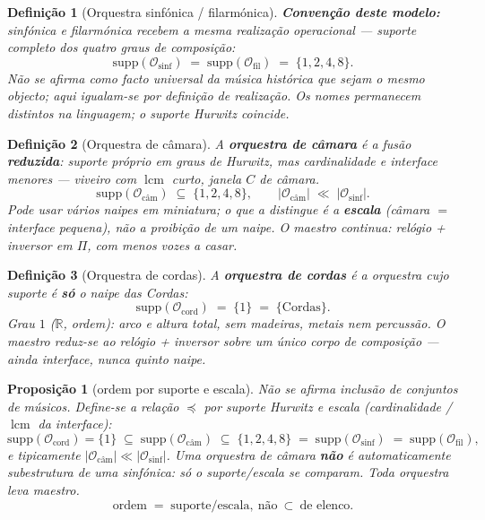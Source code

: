 \documentclass[11pt,a4paper]{article}
\newtheorem{definicao}{Definição}
\newtheorem{proposicao}{Proposição}
\begin{document}
\begin{definicao}[Orquestra sinfónica / filarmónica]\label{def:sinfonica}
\textbf{Convenção deste modelo:} sinfónica e filarmónica recebem a
\emph{mesma} realização operacional --- suporte completo dos quatro
graus de composição:
\[
\mathrm{supp}(\mathcal{O}_{\mathrm{sinf}})
\;=\;
\mathrm{supp}(\mathcal{O}_{\mathrm{fil}})
\;=\;
\{1,2,4,8\}.
\]
Não se afirma como facto universal da música histórica que sejam o
mesmo objecto; aqui igualam-se por definição de realização. Os nomes
permanecem distintos na linguagem; o suporte Hurwitz coincide.
\end{definicao}

\begin{definicao}[Orquestra de câmara]\label{def:camara}
A \textbf{orquestra de câmara} é a fusão \textbf{reduzida}: suporte
próprio em graus de Hurwitz, mas cardinalidade e interface menores
--- viveiro com $\operatorname{lcm}$ curto, janela $C$ de câmara.
\[
\mathrm{supp}(\mathcal{O}_{\mathrm{câm}})
\;\subseteq\;
\{1,2,4,8\},
\qquad
|\mathcal{O}_{\mathrm{câm}}|
\;\ll\;
|\mathcal{O}_{\mathrm{sinf}}|.
\]
Pode usar vários naipes em miniatura; o que a distingue é a
\textbf{escala} (câmara $=$ interface pequena), não a proibição de um
naipe. O maestro continua: relógio + inversor em $\Pi$, com menos
vozes a casar.
\end{definicao}

\begin{definicao}[Orquestra de cordas]\label{def:orq-cordas}
A \textbf{orquestra de cordas} é a orquestra cujo suporte é
\textbf{só} o naipe das Cordas:
\[
\mathrm{supp}(\mathcal{O}_{\mathrm{cord}})
\;=\;
\{1\}
\;=\;
\{\text{Cordas}\}.
\]
Grau $1$ ($\mathbb{R}$, ordem): arco e altura total, sem madeiras,
metais nem percussão. O maestro reduz-se ao relógio + inversor sobre
um único corpo de composição --- ainda interface, nunca quinto naipe.
\end{definicao}

\begin{proposicao}[ordem por suporte e escala]\label{prop:orq-hier}
Não se afirma inclusão de conjuntos de músicos. Define-se a relação
$\preceq$ por suporte Hurwitz e escala (cardinalidade / $\operatorname{lcm}$
da interface):
\[
\mathrm{supp}(\mathcal{O}_{\mathrm{cord}})=\{1\}
\;\subseteq\;
\mathrm{supp}(\mathcal{O}_{\mathrm{câm}})
\;\subseteq\;
\{1,2,4,8\}
\;=\;
\mathrm{supp}(\mathcal{O}_{\mathrm{sinf}})
\;=\;
\mathrm{supp}(\mathcal{O}_{\mathrm{fil}}),
\]
e tipicamente $|\mathcal{O}_{\mathrm{câm}}|\ll|\mathcal{O}_{\mathrm{sinf}}|$.
Uma orquestra de câmara \textbf{não} é automaticamente subestrutura
de uma sinfónica: só o suporte/escala se comparam. Toda orquestra leva
maestro.
\[
\boxed{
\text{ordem}\;=\;\text{suporte/escala},\ \text{não}\ \subset\ \text{de elenco}.
}
\]
\end{proposicao}
\end{document}
